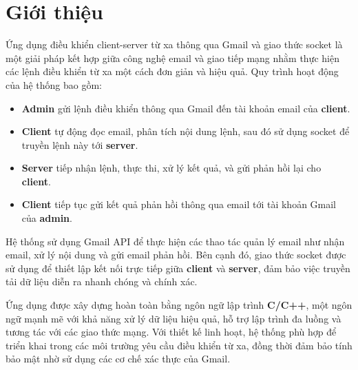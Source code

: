 \section{Giới thiệu}

Ứng dụng điều khiển client-server từ xa thông qua Gmail và giao thức socket là một giải pháp kết hợp giữa công nghệ email và giao tiếp mạng nhằm thực hiện các lệnh điều khiển từ xa một cách đơn giản và hiệu quả. Quy trình hoạt động của hệ thống bao gồm:

\begin{itemize}
    \item \textbf{Admin} gửi lệnh điều khiển thông qua Gmail đến tài khoản email của \textbf{client}.
    \item \textbf{Client} tự động đọc email, phân tích nội dung lệnh, sau đó sử dụng socket để truyền lệnh này tới \textbf{server}.
    \item \textbf{Server} tiếp nhận lệnh, thực thi, xử lý kết quả, và gửi phản hồi lại cho \textbf{client}.
    \item \textbf{Client} tiếp tục gửi kết quả phản hồi thông qua email tới tài khoản Gmail của \textbf{admin}.
\end{itemize}

Hệ thống sử dụng Gmail API để thực hiện các thao tác quản lý email như nhận email, xử lý nội dung và gửi email phản hồi. Bên cạnh đó, giao thức socket được sử dụng để thiết lập kết nối trực tiếp giữa \textbf{client} và \textbf{server}, đảm bảo việc truyền tải dữ liệu diễn ra nhanh chóng và chính xác.

Ứng dụng được xây dựng hoàn toàn bằng ngôn ngữ lập trình \textbf{C/C++}, một ngôn ngữ mạnh mẽ với khả năng xử lý dữ liệu hiệu quả, hỗ trợ lập trình đa luồng và tương tác với các giao thức mạng. Với thiết kế linh hoạt, hệ thống phù hợp để triển khai trong các môi trường yêu cầu điều khiển từ xa, đồng thời đảm bảo tính bảo mật nhờ sử dụng các cơ chế xác thực của Gmail.

\newpage